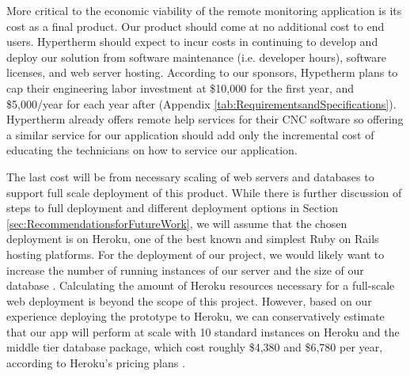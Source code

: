 \documentclass[12pt,letterpaper,titlepage]{article}
\begin{document}
More critical to the economic viability of the remote monitoring application is its cost as a final product. Our product should come at no additional cost to end users. Hypertherm should expect to incur costs in continuing to develop and deploy our solution from software maintenance (i.e. developer hours), software licenses, and web server hosting. According to our sponsors, Hypetherm plans to cap their engineering labor investment at \$10,000 for the first year, and \$5,000/year for each year after (Appendix \ref{tab:RequirementsandSpecifications}). Hypertherm already offers remote help services for their CNC software so offering a similar service for our application should add only the incremental cost of educating the technicians on how to service our application. 

The last cost will be from necessary scaling of web servers and databases to support full scale deployment of this product. While there is further discussion of steps to full deployment and different deployment options in Section \ref{sec:RecommendationsforFutureWork}, we will assume that the chosen deployment is on Heroku, one of the best known and simplest Ruby on Rails hosting platforms. For the deployment of our project, we would likely want to increase the number of running instances of our server and the size of our database \cite{scaling}. Calculating the amount of Heroku resources necessary for a full-scale web deployment is beyond the scope of this project. However, based on our experience deploying the prototype to Heroku, we can conservatively estimate that our app will perform at scale with 10 standard instances on Heroku and the middle tier database package, which cost roughly \$4,380 and \$6,780 per year, according to Heroku's pricing plans \cite{heroku pricing}. 
\end{document}
